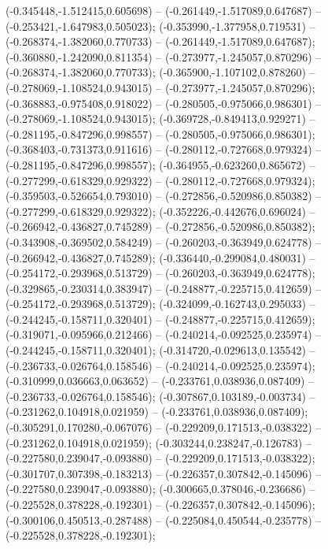  (-0.345448,-1.512415,0.605698) -- (-0.261449,-1.517089,0.647687) -- (-0.253421,-1.647983,0.505023);
 (-0.353990,-1.377958,0.719531) -- (-0.268374,-1.382060,0.770733) -- (-0.261449,-1.517089,0.647687);
 (-0.360880,-1.242090,0.811354) -- (-0.273977,-1.245057,0.870296) -- (-0.268374,-1.382060,0.770733);
 (-0.365900,-1.107102,0.878260) -- (-0.278069,-1.108524,0.943015) -- (-0.273977,-1.245057,0.870296);
 (-0.368883,-0.975408,0.918022) -- (-0.280505,-0.975066,0.986301) -- (-0.278069,-1.108524,0.943015);
 (-0.369728,-0.849413,0.929271) -- (-0.281195,-0.847296,0.998557) -- (-0.280505,-0.975066,0.986301);
 (-0.368403,-0.731373,0.911616) -- (-0.280112,-0.727668,0.979324) -- (-0.281195,-0.847296,0.998557);
 (-0.364955,-0.623260,0.865672) -- (-0.277299,-0.618329,0.929322) -- (-0.280112,-0.727668,0.979324);
 (-0.359503,-0.526654,0.793010) -- (-0.272856,-0.520986,0.850382) -- (-0.277299,-0.618329,0.929322);
 (-0.352226,-0.442676,0.696024) -- (-0.266942,-0.436827,0.745289) -- (-0.272856,-0.520986,0.850382);
 (-0.343908,-0.369502,0.584249) -- (-0.260203,-0.363949,0.624778) -- (-0.266942,-0.436827,0.745289);
 (-0.336440,-0.299084,0.480031) -- (-0.254172,-0.293968,0.513729) -- (-0.260203,-0.363949,0.624778);
 (-0.329865,-0.230314,0.383947) -- (-0.248877,-0.225715,0.412659) -- (-0.254172,-0.293968,0.513729);
 (-0.324099,-0.162743,0.295033) -- (-0.244245,-0.158711,0.320401) -- (-0.248877,-0.225715,0.412659);
 (-0.319071,-0.095966,0.212466) -- (-0.240214,-0.092525,0.235974) -- (-0.244245,-0.158711,0.320401);
 (-0.314720,-0.029613,0.135542) -- (-0.236733,-0.026764,0.158546) -- (-0.240214,-0.092525,0.235974);
 (-0.310999,0.036663,0.063652) -- (-0.233761,0.038936,0.087409) -- (-0.236733,-0.026764,0.158546);
 (-0.307867,0.103189,-0.003734) -- (-0.231262,0.104918,0.021959) -- (-0.233761,0.038936,0.087409);
 (-0.305291,0.170280,-0.067076) -- (-0.229209,0.171513,-0.038322) -- (-0.231262,0.104918,0.021959);
 (-0.303244,0.238247,-0.126783) -- (-0.227580,0.239047,-0.093880) -- (-0.229209,0.171513,-0.038322);
 (-0.301707,0.307398,-0.183213) -- (-0.226357,0.307842,-0.145096) -- (-0.227580,0.239047,-0.093880);
 (-0.300665,0.378046,-0.236686) -- (-0.225528,0.378228,-0.192301) -- (-0.226357,0.307842,-0.145096);
 (-0.300106,0.450513,-0.287488) -- (-0.225084,0.450544,-0.235778) -- (-0.225528,0.378228,-0.192301);
